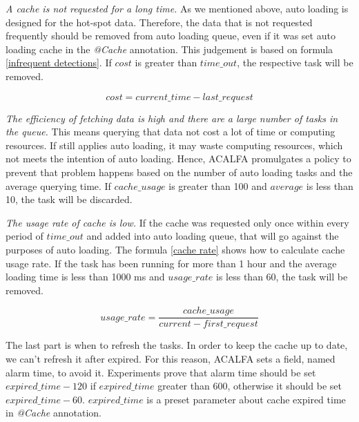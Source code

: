\documentclass{singlecol-new}
\theoremstyle{TH}{
\newtheorem{lemma}{Lemma}
\newtheorem{theorem}[lemma]{Theorem}
\newtheorem{corrolary}[lemma]{Corrolary}
\newtheorem{conjecture}[lemma]{Conjecture}
\newtheorem{proposition}[lemma]{Proposition}
\newtheorem{claim}[lemma]{Claim}
\newtheorem{stheorem}[lemma]{Wrong Theorem}
}
\theoremstyle{THrm}{
\newtheorem{definition}{Definition}[section]
\newtheorem{question}{Question}[section]
\newtheorem{remark}{Remark}
\newtheorem{scheme}{Scheme}
}
\theoremstyle{THhit}{
\newtheorem{case}{Case}[section]
}
\begin{document}
\textit{A cache is not requested for a long time.} As we mentioned above, auto loading is designed for the hot-spot data. Therefore, the data that is not requested frequently should be removed from auto loading queue, even if it was set auto loading cache in the \textit{@Cache} annotation. This judgement is based on formula \ref{infrequent detections}. If $cost$ is greater than $time\_out$, the respective task will be removed.

\begin{equation}
    cost = current\_time - last\_request
    \label{infrequent detections}
\end{equation}

\textit{The efficiency of fetching data is high and there are a large number of tasks in the queue.} This means querying that data not cost a lot of time or computing resources. If still applies auto loading, it may waste computing resources, which not meets the intention of auto loading. Hence, ACALFA promulgates a policy to prevent that problem happens based on the number of auto loading tasks and the average querying time. If $cache\_usage$ is greater than 100 and $average$ is less than 10, the task will be discarded.

\textit{The usage rate of cache is low.} If the cache was requested only once within every period of $time\_out$ and added into auto loading queue, that will go against the purposes of auto loading. The formula \ref{cache rate} shows how to calculate cache usage rate. If the task has been running for more than 1 hour and the average loading time is less than 1000 ms and $usage\_rate$ is less than 60, the task will be removed.

\begin{equation}
    usage\_rate = \frac{cache\_usage}{current - first\_request}
    \label{cache rate}
\end{equation}

The last part is when to refresh the tasks. In order to keep the cache up to date, we can't refresh it after expired. For this reason, ACALFA sets a field, named alarm time, to avoid it. Experiments prove that alarm time should be set $expired\_time - 120$ if $expired\_time$ greater than 600, otherwise it should be set $expired\_time - 60$. $expired\_time$ is a preset parameter about cache expired time in \textit{@Cache} annotation.
\end{document}
